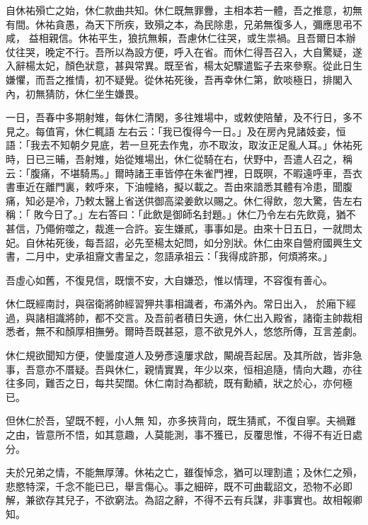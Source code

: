 \begin{pinyinscope}
 自休祐殞亡之始，休仁款曲共知。休仁既無罪釁，主相本若一體，吾之推意，初無有間。休祐貪愚，為天下所疾，致殞之本，為民除患，兄弟無復多人，彌應思弔不咸，
 益相親信。休祐平生，狼抗無賴，吾慮休仁往哭，或生祟禍。且吾爾日本辦仗往哭，晚定不行。吾所以為設方便，呼入在省。而休仁得吾召入，大自驚疑，遂入辭楊太妃，顏色狀意，甚與常異。既至省，楊太妃驟遣監子去來參察。從此日生嫌懼，而吾之推情，初不疑覺。從休祐死後，吾再幸休仁第，飲啖極日，排閣入內，初無猜防，休仁坐生嫌畏。



 一日，吾春中多期射雉，每休仁清閑，多往雉場中，或敕使陪輦，及不行日，多不見之。每值宵，休仁輒語
 左右云：「我已復得今一日。」及在房內見諸妓妾，恒語：「我去不知朝夕見底，若一旦死去作鬼，亦不取汝，取汝正足亂人耳。」休祐死時，日已三晡，吾射雉，始從雉場出，休仁從騎在右，伏野中，吾遣人召之，稱云：「腹痛，不堪騎馬。」爾時諸王車皆停在朱雀門裡，日既暝，不暇遠呼車，吾衣書車近在離門裏，敕呼來，下油幢絡，擬以載之。吾由來諳悉其體有冷患，聞腹痛，知必是冷，乃敕太醫上省送供御高梁姜飲以賜之。休仁得飲，忽大驚，告左右稱：「
 敗今日了。」左右答曰：「此飲是御師名封題。」休仁乃令左右先飲竟，猶不甚信，乃僶俯噬之，裁進一合許。妄生嫌貳，事事如是。由來十日五日，一就問太妃。自休祐死後，每吾詔，必先至楊太妃問，如分別狀。休仁由來自營府國興生文書，二月中，史承祖齎文書呈之，忽語承祖云：「我得成許那，何煩將來。」



 吾虛心如舊，不復見信，既懷不安，大自嫌恐，惟以情理，不容復有善心。



 休仁既經南討，與宿衛將帥經習狎共事相識者，布滿外內。常日出入，
 於廂下經過，與諸相識將帥，都不交言。及吾前者積日失適，休仁出入殿省，諸衛主帥裁相悉者，無不和顏厚相撫勞。爾時吾既甚惡，意不欲見外人，悠悠所傳，互言差劇。



 休仁規欲聞知方便，使曇度道人及勞彥遠屢求啟，闞覘吾起居。及其所啟，皆非急事，吾意亦不厝疑。吾與休仁，親情實異，年少以來，恒相追隨，情向大趣，亦往往多同，難否之日，每共契闊。休仁南討為都統，既有勳績，狀之於心，亦何極已。



 但休仁於吾，望既不輕，小人無
 知，亦多挾背向，既生猜貳，不復自寧。夫禍難之由，皆意所不悟，如其意趣，人莫能測，事不獲已，反覆思惟，不得不有近日處分。



 夫於兄弟之情，不能無厚薄。休祐之亡，雖復悼念，猶可以理割遣；及休仁之殞，悲愍特深，千念不能已已，舉言傷心。事之細碎，既不可曲載詔文，恐物不必即解，兼欲存其兒子，不欲窮法。為詔之辭，不得不云有兵謀，非事實也。故相報卿知。




\end{pinyinscope}

